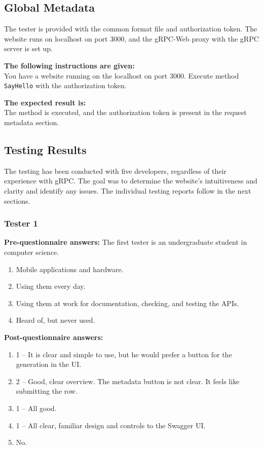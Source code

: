 \subsection{Global Metadata}
The tester is provided with the common format file and authorization token.
The website runs on localhost on port 3000, and the gRPC-Web proxy with the gRPC server is set up.

\textbf{The following instructions are given:}\\
You have a website running on the localhost on port 3000.
Execute method \texttt{SayHello} with the authorization token.

\textbf{The expected result is:}\\
The method is executed, and the authorization token is present in the request metadata section.

\subsection{Testing Results}
The testing has been conducted with five developers, regardless of their experience with gRPC\@.
The goal was to determine the website's intuitiveness and clarity and identify any issues.
The individual testing reports follow in the next sections.

\subsubsection{Tester 1}
\textbf{Pre-questionnaire answers:}
The first tester is an undergraduate student in computer science.

\begin{enumerate}
    \item Mobile applications and hardware.
    \item Using them every day.
    \item Using them at work for documentation, checking, and testing the APIs.
    \item Heard of, but never used.
\end{enumerate}

\textbf{Post-questionnaire answers:}
\begin{enumerate}
    \item 1 -- It is clear and simple to use, but he would prefer a button for the generation in the UI\@.
    \item 2 -- Good, clear overview.
    The metadata button is not clear.
    It feels like submitting the row.
    \item 1 -- All good.
    \item 1 -- All clear, familiar design and controls to the Swagger UI\@.
    \item No.
\end{enumerate}

